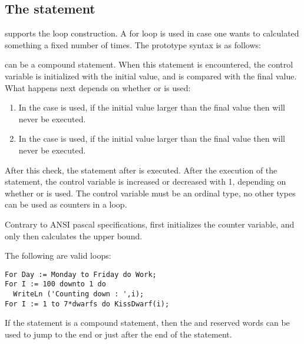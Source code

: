 \subsection{The  statement}
\fpc supports the  loop construction. A for loop is used in case
one wants to calculated something a fixed number of times.
The prototype syntax is as follows:

 can be a compound statement.
When this statement is encountered, the control variable is initialized with
the initial value, and is compared with the final value.
What happens next depends on whether  or  is used:
\begin{enumerate}
\item In the case  is used, if the initial value larger than the final
value then  will never be executed.
\item In the case  is used, if the initial value larger than the final
value then  will never be executed.
\end{enumerate}
After this check, the statement after  is executed. After the
execution of the statement, the control variable is increased or decreased
with 1, depending on whether  or  is used.
The control variable must be an ordinal type, no other
types can be used as counters in a loop.

\begin{remark}
Contrary to ANSI pascal specifications, \fpc first initializes
the counter variable, and only then calculates the upper bound.
\end{remark}

The following are valid loops:
\begin{verbatim}
For Day := Monday to Friday do Work;
For I := 100 downto 1 do
  WriteLn ('Counting down : ',i);
For I := 1 to 7*dwarfs do KissDwarf(i);
\end{verbatim}

If the statement is a compound statement, then  the  and
 reserved words can be used to jump to the end or just
after the end of the  statement.


